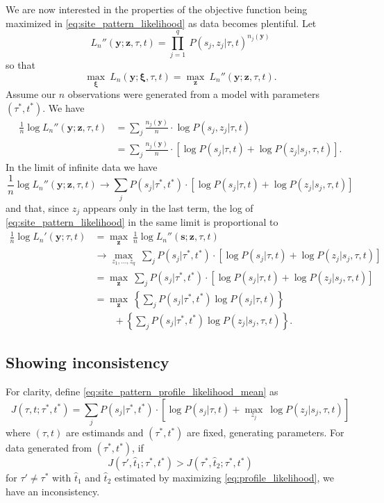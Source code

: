 \documentclass[a4paper]{article}
\begin{document}
We are now interested in the properties of the objective function being maximized in \eqref{eq:site_pattern_likelihood} as data becomes plentiful.
Let
$$
L_n''(\mathbf{y};\mathbf{z},\tau,t) = \prod_{j=1}^q \ P(s_j, z_j | \tau, t)^{n_j(\mathbf{y})}
$$
so that
$$
\max_{\boldsymbol\xi} \ L_n(\mathbf{y};\boldsymbol\xi, \tau, t) = \max_{\mathbf{z}} \ L_n''(\mathbf{y};\mathbf{z},\tau,t).
$$
Assume our $n$ observations were generated from a model with parameters $(\tau^*, t^*)$.
We have
\begin{align}
\frac{1}{n} \log L_n''(\mathbf{y};\mathbf{z},\tau,t) &= \sum_{j} \frac{n_j(\mathbf{y})}{n}\cdot \log P(s_j, z_j | \tau, t) \\
  &= \sum_{j} \frac{n_j(\mathbf{y})}{n}\cdot [\log P(s_j | \tau, t) + \log P(z_j | s_j, \tau, t)].
\end{align}
In the limit of infinite data we have
$$
\frac{1}{n} \log L_n''(\mathbf{y};\mathbf{z},\tau,t) \rightarrow \sum_{j} P(s_j | \tau^*, t^*) \cdot [\log P(s_j | \tau, t) + \log P(z_j | s_j, \tau, t)]
$$
and that, since $z_j$ appears only in the last term, the log of \eqref{eq:site_pattern_likelihood} in the same limit is proportional to
\begin{align}
\frac{1}{n} \log L_n'(\mathbf{y};\tau, t) &= \max_{\mathbf{z}} \ \frac{1}{n} \log L_n''(\mathbf{s};\mathbf{z},\tau,t) \nonumber \\
    &\rightarrow \max_{z_1, \ldots, z_q} \ \sum_{j} P(s_j | \tau^*, t^*) \cdot [\log P(s_j | \tau, t) + \log P(z_j | s_j, \tau, t)] \nonumber \\
    &= \max_{\mathbf{z}} \ \sum_{j} P(s_j | \tau^*, t^*) \cdot [\log P(s_j | \tau, t) + \log P(z_j | s_j, \tau, t)] \nonumber \\
    &= \max_{\mathbf{z}} \ \left\{\sum_{j} P(s_j | \tau^*, t^*) \log P(s_j | \tau, t)\right\} \nonumber \\
    &\qquad + \left\{\sum_{j} P(s_j | \tau^*, t^*) \log P(z_j | s_j, \tau, t)\right\}. \label{eq:site_pattern_profile_likelihood_mean}
\end{align}

\subsection{Showing inconsistency}

For clarity, define \eqref{eq:site_pattern_profile_likelihood_mean} as
$$
J(\tau, t; \tau^*, t^*) = \sum_{j} P(s_j | \tau^*, t^*) \cdot [\log P(s_j | \tau, t) + \max_{z_j} \ \log P(z_j | s_j, \tau, t)]
$$
where $(\tau, t)$ are estimands and $(\tau^*, t^*)$ are fixed, generating parameters.
For data generated from $(\tau^*, t^*)$, if
\begin{equation}
\label{eq:inconsistency_inequality}
J(\tau', \hat{t}_1; \tau^*, t^*) > J(\tau^*, \hat{t}_2; \tau^*, t^*)
\end{equation}
for $\tau'\neq\tau^*$ with $\hat{t}_1$ and $\hat{t}_2$ estimated by maximizing \eqref{eq:profile_likelihood}, we have an inconsistency.
\end{document}
